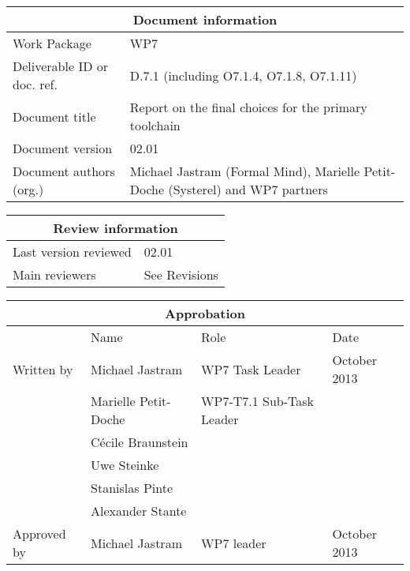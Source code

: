 \documentclass{template/openetcs_report}
\begin{document}
\tableofcontents
\listoffiguresandtables



\begin{tabular}{|p{4.4cm}|p{8.7cm}|}
\hline
\multicolumn{2}{|c|}{Document information} \\
\hline
Work Package &  WP7  \\
Deliverable ID or doc. ref. & D.7.1 (including O7.1.4, O7.1.8, O7.1.11) \\
\hline
Document title & Report on the final choices for the primary toolchain \\
Document version & 02.01 \\
Document authors (org.)  & Michael Jastram (Formal Mind), Marielle Petit-Doche (Systerel) and WP7 partners  \\
\hline
\end{tabular}

\begin{tabular}{|p{4.4cm}|p{8.7cm}|}
\hline
\multicolumn{2}{|c|}{Review information} \\
\hline
Last version reviewed & 02.01 \\
\hline
Main reviewers & See Revisions \\
\hline
\end{tabular}

\begin{tabular}{|p{2.2cm}|p{4cm}|p{4cm}|p{2cm}|}
\hline
\multicolumn{4}{|c|}{Approbation} \\
\hline
  &  Name & Role & Date   \\
\hline  
Written by  & Michael Jastram & WP7 Task Leader  &  October 2013 \\
&  Marielle Petit-Doche & WP7-T7.1 Sub-Task Leader  & \\
& Cécile Braunstein & &  \\
& Uwe Steinke & &  \\
& Stanislas Pinte & &  \\
& Alexander Stante & &  \\
\hline
Approved by & Michael Jastram & WP7 leader & October 2013 \\
\hline
\end{tabular}



\newcommand{\tbd}{\colorbox{cyan}{\%\%To Be Defined\%\%}}
\newcommand{\tbc}{\colorbox{cyan}{\%\%To Be Confirmed\%\%}}
\newcommand{\todo}[1]{\colorbox{cyan}{\%\%{#1}\%\%}}
\newlength{\origindent}
\end{document}
